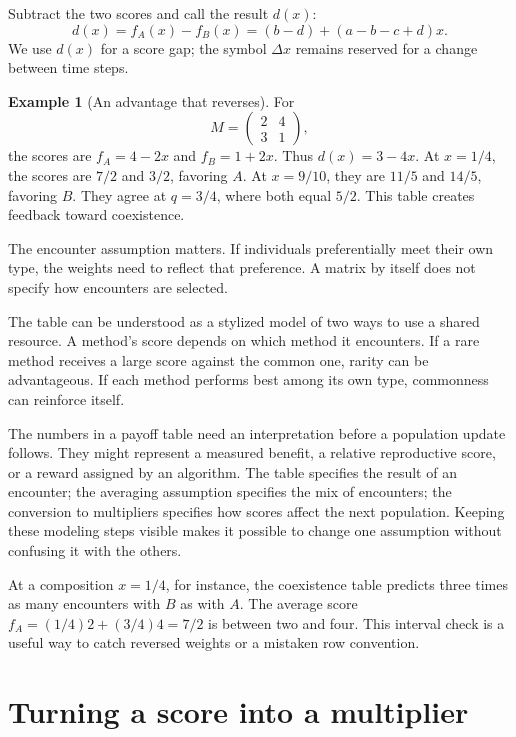 \documentclass[11pt,oneside,openany]{book}
\theoremstyle{definition}
\newtheorem{example}{Example}[chapter]
\theoremstyle{remark}
\numberwithin{equation}{chapter}
\begin{document}
Subtract the two scores and call the result \(d(x)\): \[d(x)=f_A(x)-f_B(x)=(b-d)+(a-b-c+d)x.\] We use \(d(x)\) for a score gap; the symbol \(\Delta x\) remains reserved for a change between time steps.

\begin{example}[An advantage that reverses]

For \[M=\begin{pmatrix}2&4\\3&1\end{pmatrix},\] the scores are \(f_A=4-2x\) and \(f_B=1+2x\). Thus \(d(x)=3-4x\). At \(x=1/4\), the scores are \(7/2\) and \(3/2\), favoring \(A\). At \(x=9/10\), they are \(11/5\) and \(14/5\), favoring \(B\). They agree at \(q=3/4\), where both equal \(5/2\). This table creates feedback toward coexistence.

\end{example}

The encounter assumption matters. If individuals preferentially meet their own type, the weights need to reflect that preference. A matrix by itself does not specify how encounters are selected.

The table can be understood as a stylized model of two ways to use a shared resource. A method's score depends on which method it encounters. If a rare method receives a large score against the common one, rarity can be advantageous. If each method performs best among its own type, commonness can reinforce itself.

The numbers in a payoff table need an interpretation before a population update follows. They might represent a measured benefit, a relative reproductive score, or a reward assigned by an algorithm. The table specifies the result of an encounter; the averaging assumption specifies the mix of encounters; the conversion to multipliers specifies how scores affect the next population. Keeping these modeling steps visible makes it possible to change one assumption without confusing it with the others.

At a composition \(x=1/4\), for instance, the coexistence table predicts three times as many encounters with \(B\) as with \(A\). The average score \(f_A=(1/4)2+(3/4)4=7/2\) is between two and four. This interval check is a useful way to catch reversed weights or a mistaken row convention.

\section{Turning a score into a multiplier}\label{ch02-turning-a-score-into-a-multiplier}
\end{document}
